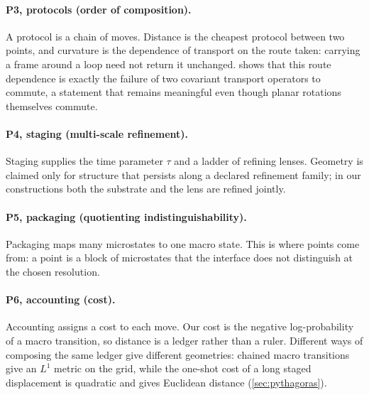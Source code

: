 \documentclass[11pt]{article}
\begin{document}
\paragraph{P3, protocols (order of composition).}
A protocol is a chain of moves.
Distance is the cheapest protocol between two points, and curvature is the dependence of transport on the route taken: carrying a frame around a loop need not return it unchanged.
 shows that this route dependence is exactly the failure of two covariant transport operators to commute, a statement that remains meaningful even though planar rotations themselves commute.

\paragraph{P4, staging (multi-scale refinement).}
Staging supplies the time parameter $\tau$ and a ladder of refining lenses.
Geometry is claimed only for structure that persists along a declared refinement family; in our constructions both the substrate and the lens are refined jointly.

\paragraph{P5, packaging (quotienting indistinguishability).}
Packaging maps many microstates to one macro state.
This is where points come from: a point is a block of microstates that the interface does not distinguish at the chosen resolution.

\paragraph{P6, accounting (cost).}
Accounting assigns a cost to each move.
Our cost is the negative log-probability of a macro transition, so distance is a ledger rather than a ruler.
Different ways of composing the same ledger give different geometries: chained macro transitions give an $L^1$ metric on the grid, while the one-shot cost of a long staged displacement is quadratic and gives Euclidean distance (\cref{sec:pythagoras}).
\end{document}
